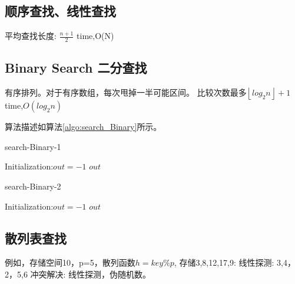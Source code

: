 \documentclass[UTF8]{../computerUniverse}
\begin{document}
\subsection{顺序查找、线性查找}
平均查找长度: $\frac{n+1}{2}$
time,O(N)


\subsection{Binary Search 二分查找}
有序排列。对于有序数组，每次甩掉一半可能区间。
比较次数最多$\left\lfloor log_2n\right\rfloor +1$
time,$O(log_2n)$


算法描述如算法\ref{algo:search_Binary}所示。

      \begin{algorithm}[h]%
        \caption{search-Binary-1}\label{algo:search_Binary_1}
        \SetAlgoLined
        \KwIn{ordered range set $S = [l,r)$, the search number $t$}
        Initialization:$out = -1$\;
        \KwRet $out$\;
      \end{algorithm}

      \begin{algorithm}[h]%
        \caption{search-Binary-2}\label{algo:search_Binary_2}
        \SetAlgoLined
        Initialization:$out = -1$\;
        \KwRet $out$\;
      \end{algorithm}



\subsection{散列表查找}
例如，存储空间10，p=5，散列函数$h=key\%p$,
存储3,8,12,17,9: 线性探测:  3,4，2，5,6
冲突解决: 线性探测，伪随机数。
\end{document}
